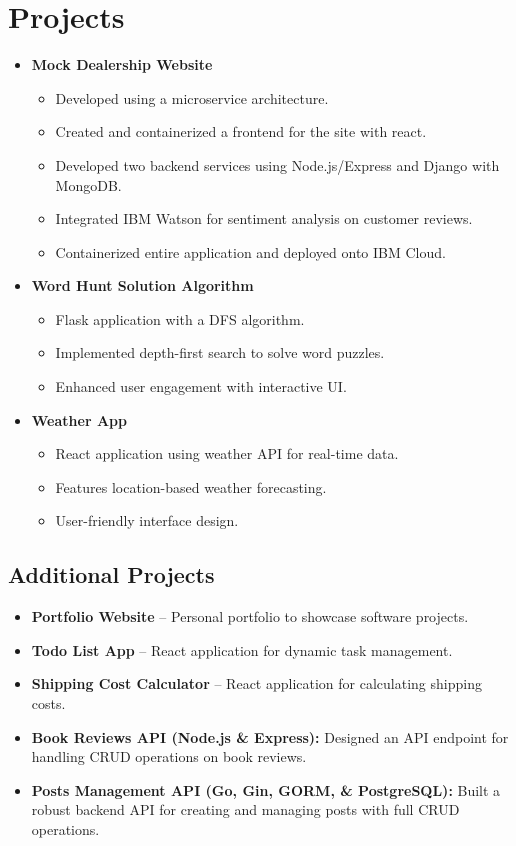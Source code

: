 \documentclass[11pt,a4paper,sans]{moderncv}
\begin{document}
\section{Projects}
\begin{itemize}
    \item \textbf{Mock Dealership Website}
    \begin{itemize}
        \item Developed using a microservice architecture.
        \item Created and containerized a frontend for the site with react.
        \item Developed two backend services using Node.js/Express and Django with MongoDB.
        \item Integrated IBM Watson for sentiment analysis on customer reviews.
        \item Containerized entire application and deployed onto IBM Cloud.
    \end{itemize}
    \item \textbf{Word Hunt Solution Algorithm}
    \begin{itemize}
        \item Flask application with a DFS algorithm.
        \item Implemented depth-first search to solve word puzzles.
        \item Enhanced user engagement with interactive UI.
    \end{itemize}
    \item \textbf{Weather App}
    \begin{itemize}
        \item React application using weather API for real-time data.
        \item Features location-based weather forecasting.
        \item User-friendly interface design.
    \end{itemize}
\end{itemize}

\subsection{Additional Projects}
\begin{itemize}
    \item \textbf{Portfolio Website} -- Personal portfolio to showcase software projects.
    \item \textbf{Todo List App} -- React application for dynamic task management.
    \item \textbf{Shipping Cost Calculator} -- React application for calculating shipping costs.
    \item \textbf{Book Reviews API (Node.js \& Express):} Designed an API endpoint for handling CRUD operations on book reviews.
    \item \textbf{Posts Management API (Go, Gin, GORM, \& PostgreSQL):} Built a robust backend API for creating and managing posts with full CRUD operations.
\end{itemize}
\end{document}
